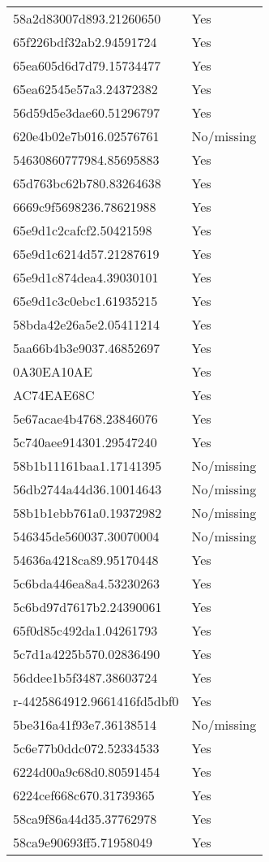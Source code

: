 \begin{tabular}{ll}
58a2d83007d893.21260650 & Yes \\
65f226bdf32ab2.94591724 & Yes \\
65ea605d6d7d79.15734477 & Yes \\
65ea62545e57a3.24372382 & Yes \\
56d59d5e3dae60.51296797 & Yes \\
620e4b02e7b016.02576761 & No/missing \\
54630860777984.85695883 & Yes \\
65d763bc62b780.83264638 & Yes \\
6669c9f5698236.78621988 & Yes \\
65e9d1c2cafcf2.50421598 & Yes \\
65e9d1c6214d57.21287619 & Yes \\
65e9d1c874dea4.39030101 & Yes \\
65e9d1c3c0ebc1.61935215 & Yes \\
58bda42e26a5e2.05411214 & Yes \\
5aa66b4b3e9037.46852697 & Yes \\
0A30EA10AE & Yes \\
AC74EAE68C & Yes \\
5e67acae4b4768.23846076 & Yes \\
5c740aee914301.29547240 & Yes \\
58b1b11161baa1.17141395 & No/missing \\
56db2744a44d36.10014643 & No/missing \\
58b1b1ebb761a0.19372982 & No/missing \\
546345de560037.30070004 & No/missing \\
54636a4218ca89.95170448 & Yes \\
5c6bda446ea8a4.53230263 & Yes \\
5c6bd97d7617b2.24390061 & Yes \\
65f0d85c492da1.04261793 & Yes \\
5c7d1a4225b570.02836490 & Yes \\
56ddee1b5f3487.38603724 & Yes \\
r-4425864912.9661416fd5dbf0 & Yes \\
5be316a41f93e7.36138514 & No/missing \\
5c6e77b0ddc072.52334533 & Yes \\
6224d00a9c68d0.80591454 & Yes \\
6224cef668c670.31739365 & Yes \\
58ca9f86a44d35.37762978 & Yes \\
58ca9e90693ff5.71958049 & Yes \\

\end{tabular}
